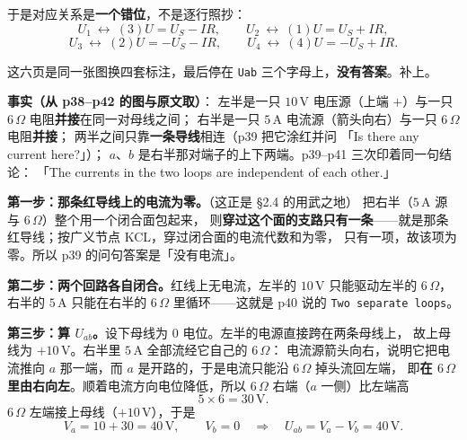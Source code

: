 \documentclass[11pt]{ctexart}
\begin{document}
于是对应关系是\textbf{一个错位}，不是逐行照抄：
\[ U_1\ \longleftrightarrow\ (3)U=U_S-IR,\qquad
   U_2\ \longleftrightarrow\ (1)U=U_S+IR, \]
\[ U_3\ \longleftrightarrow\ (2)U=-U_S-IR,\qquad
   U_4\ \longleftrightarrow\ (4)U=-U_S+IR . \]



这六页是同一张图换四套标注，最后停在 \texttt{Uab} 三个字母上，\textbf{没有答案}。补上。

\textbf{事实（从 p38--p42 的图与原文取）}：
左半是一只 $10\,\mathrm{V}$ 电压源（上端 $+$）与一只 $6\,\Omega$ 电阻\textbf{并接}在同一对母线之间；
右半是一只 $5\,\mathrm{A}$ 电流源（箭头向右）与一只 $6\,\Omega$ 电阻\textbf{并接}；
两半之间只靠\textbf{一条导线}相连（p39 把它涂红并问 「Is there any current here?」）；
$a$、$b$ 是右半那对端子的上下两端。p39--p41 三次印着同一句结论：
「The currents in the two loops are independent of each other.」

\textbf{第一步：那条红导线上的电流为零。}（这正是 §2.4 的用武之地）
把右半（$5\,\mathrm{A}$ 源与 $6\,\Omega$）整个用一个闭合面包起来，
则\textbf{穿过这个面的支路只有一条}——就是那条红导线；按广义节点 KCL，穿过闭合面的电流代数和为零，
只有一项，故该项为零。所以 p39 的问句答案是「没有电流」。

\textbf{第二步：两个回路各自闭合。}红线上无电流，左半的 $10\,\mathrm{V}$ 只能驱动左半的 $6\,\Omega$，
右半的 $5\,\mathrm{A}$ 只能在右半的 $6\,\Omega$ 里循环——这就是 p40 说的 \texttt{Two separate loops}。

\textbf{第三步：算 $U_{ab}$。}设下母线为 $0$ 电位。左半的电源直接跨在两条母线上，
故上母线为 $+10\,\mathrm{V}$。右半里 $5\,\mathrm{A}$ 全部流经它自己的 $6\,\Omega$：
电流源箭头向右，说明它把电流推向 $a$ 那一端，而 $a$ 是开路的，于是电流只能沿 $6\,\Omega$ 掉头流回左端，
即\textbf{在 $6\,\Omega$ 里由右向左}。顺着电流方向电位降低，所以 $6\,\Omega$ 右端（$a$ 一侧）比左端高
\[ 5\times6=30\,\mathrm{V} . \]
$6\,\Omega$ 左端接上母线（$+10\,\mathrm{V}$），于是
\[ V_a=10+30=40\,\mathrm{V},\qquad V_b=0\quad\Longrightarrow\quad U_{ab}=V_a-V_b=40\,\mathrm{V} . \]

\end{document}
